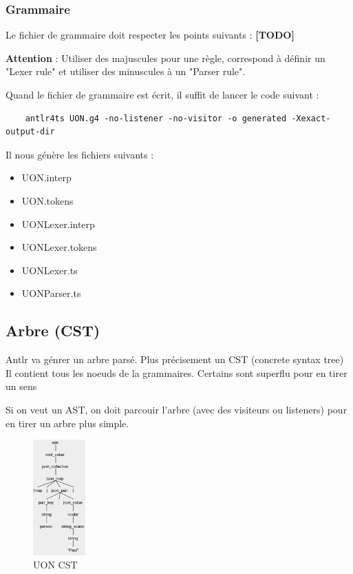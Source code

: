 \documentclass[
    iict, %
    il, %
]{heig-tb}
\begin{document}
\subsubsection{Grammaire}
Le fichier de grammaire doit respecter les points suivants : \textbf{[TODO]}

\textbf{Attention} : Utiliser des majuscules pour une règle, correspond à définir un "Lexer rule" et utiliser des minuscules à un  "Parser rule".

Quand le fichier de grammaire est écrit, il suffit de lancer le code suivant :

\begin{lstlisting}
    antlr4ts UON.g4 -no-listener -no-visitor -o generated -Xexact-output-dir
\end{lstlisting}

Il nous génère les fichiers suivants :
\begin{itemize}
    \item UON.interp
    \item UON.tokens
    \item UONLexer.interp
    \item UONLexer.tokens
    \item UONLexer.ts
    \item UONParser.ts
\end{itemize}

\subsection{Arbre (CST)}
Antlr va génrer un arbre parsé. Plus précisement un CST (concrete syntax tree)
Il contient tous les noeuds de la grammaires. Certains sont superflu pour en tirer un sens

Si on veut un AST, on doit parcouir l'arbre (avec des visiteurs ou listeners) pour en tirer un arbre plus simple.

\begin{figure}[!ht]
    \begin{center}
        \includegraphics[width=2cm]{assets/figures/tree.png}
    \end{center}
    \caption[UON CST]{\label{uon-tree} UON CST}
\end{figure}
\end{document}
